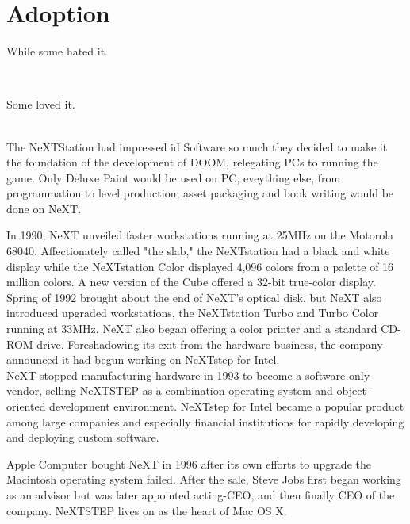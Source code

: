 \section{Adoption}
While some hated it.\\
\par
{}\\
\par
Some loved it.\\
\par
{}\\
The NeXTStation had impressed id Software so much they decided to make it the foundation of the development of DOOM, relegating PCs to running the game. Only Deluxe Paint would be used on PC, eveything else, from programmation to level production, asset packaging and book writing would be done on NeXT.


\par
In 1990, NeXT unveiled faster workstations running at 25MHz on the Motorola 68040. Affectionately called "the slab," the NeXTstation had a black and white display while the NeXTstation Color displayed 4,096 colors from a palette of 16 million colors. A new version of the Cube offered a 32-bit true-color display.
Spring of 1992 brought about the end of NeXT's optical disk, but NeXT also introduced upgraded workstations, the NeXTstation Turbo and Turbo Color running at 33MHz. NeXT also began offering a color printer and a standard CD-ROM drive. Foreshadowing its exit from the hardware business, the company announced it had begun working on NeXTstep for Intel.\\

NeXT stopped manufacturing hardware in 1993 to become a software-only vendor, selling NeXTSTEP as a combination operating system and object-oriented development environment. NeXTstep for Intel became a popular product among large companies and especially financial institutions for rapidly developing and deploying custom software. \\
\par
Apple Computer bought NeXT in 1996 after its own efforts to upgrade the Macintosh operating system failed.  After the sale, Steve Jobs first began working as an advisor but was later appointed acting-CEO, and then finally CEO of the company.  NeXTSTEP lives on as the heart of Mac OS X.\\



